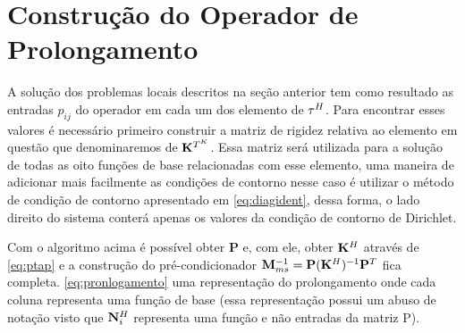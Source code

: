 \section{Construção do Operador de Prolongamento}

A solução dos problemas locais descritos na seção anterior tem como resultado as entradas $p_{ij}$ do operador em cada um dos elemento de $\tau^H$. Para encontrar esses valores é necessário primeiro construir a matriz de rigidez relativa ao elemento em questão que denominaremos de $\mathbf{K}^{T^K}$. Essa matriz será utilizada para a solução de todas as oito funções de base relacionadas com esse elemento, uma maneira de adicionar mais facilmente as condições de contorno nesse caso é utilizar o método de condição de contorno apresentado em \eqref{eq:diagident}, dessa forma, o lado direito do sistema conterá apenas os valores da condição de contorno de Dirichlet.

\vspace{1cm}
\noindent{}
\vspace{1cm}



Com o algoritmo acima é possível obter $\mathbf{P}$ e, com ele, obter $\mathbf{K}^H$ através de \eqref{eq:ptap} e a construção do pré-condicionador $\mathbf{M}^{-1}_{ms} = \mathbf{P} (\mathbf{K}^H)^{-1} \mathbf{P}^{T}$ fica completa. \eqref{eq:pronlogamento} uma representação do prolongamento onde cada coluna representa uma função de base (essa representação possui um abuso de notação visto que $\mathbf{N}_{i}^H$ representa uma função e não entradas da matriz P).



